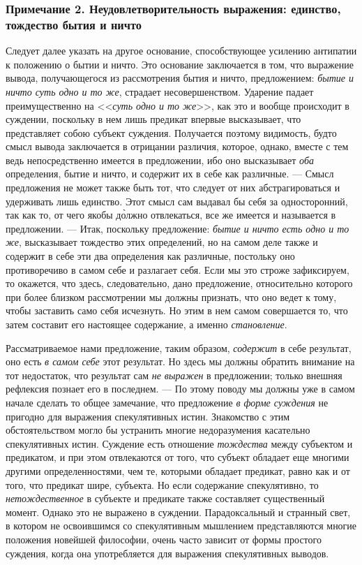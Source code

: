 \subsubsection[Примечание 2. Неудовлетворительность выражения: единство, тождество бытия и ничто]
{Примечание 2. Неудовлетворительность выражения: единство, тождество бытия и ничто}

Следует далее указать на другое основание, способствующее усилению антипатии
к положению о бытии и ничто. Это основание заключается в том, что выражение
вывода, получающегося из рассмотрения бытия и ничто, предложением:
{\em бытие и ничто суть одно и то же}, страдает
несовершенством. Ударение падает преимущественно на
<<{\em суть одно и то же}>>, как это и вообще происходит
в суждении, поскольку в нем лишь предикат впервые высказывает, что
представляет собою субъект суждения. Получается поэтому видимость, будто
смысл вывода заключается в отрицании различия, которое, однако, вместе с
тем ведь непосредственно имеется в предложении, ибо оно высказывает
{\em оба} определения, бытие и ничто, и содержит их в
себе как различные. --- Смысл предложения не может также быть тот, что
следует от них абстрагироваться и удерживать лишь единство. Этот смысл сам
выдавал бы себя за односторонний, так как то, от чего якобы д\`{о}лжно
отвлекаться, все же имеется и называется в предложении. --- Итак, поскольку
предложение: {\em бытие и ничто есть одно и то же},
высказывает тождество этих определений, но на самом деле также и содержит в
себе эти два определения как различные, постольку оно противоречиво в самом
себе и разлагает себя. Если мы это строже зафиксируем, то окажется, что
здесь, следовательно, дано предложение, относительно которого при более
близком рассмотрении мы должны признать, что оно ведет к тому, чтобы
заставить само себя исчезнуть. Но этим в нем самом совершается то, что
затем составит его настоящее содержание, а именно
{\em становление}.

Рассматриваемое нами предложение, таким образом,
{\em содержит} в себе результат, оно есть
{\em в самом себе} этот результат. Но здесь мы должны
обратить внимание на тот недостаток, что результат сам
{\em не выражен} в предложении; только внешняя
рефлексия познает его в последнем. --- По этому поводу мы должны уже в самом
начале сделать то общее замечание, что предложение
{\em в форме суждения} не пригодно для выражения
спекулятивных истин. Знакомство с этим обстоятельством могло бы устранить
многие недоразумения касательно спекулятивных истин. Суждение есть
отношение {\em тождества} между субъектом и предикатом,
и при этом отвлекаются от того, что субъект обладает еще многими другими
определенностями, чем те, которыми обладает предикат, равно как и от того,
что предикат шире, субъекта. Но если содержание спекулятивно, то
{\em нетождественное} в субъекте и предикате также
составляет существенный момент. Однако это не выражено в суждении.
Парадоксальный и странный свет, в котором не освоившимся со спекулятивным
мышлением представляются многие положения новейшей философии, очень часто
зависит от формы простого суждения, когда она употребляется для выражения
спекулятивных выводов.

